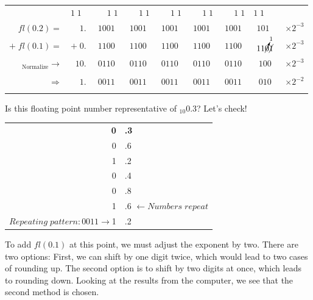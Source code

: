 \documentclass[a4paper,12pt]{report}
\begin{document}
\begin{center}
	\begin{tabular}{rrccccccr}
		&\tiny{$1\;1\;\;$} & \tiny{$\quad\, \;1\;1$} & \tiny{$\quad\, \;1\;1$}
			& \tiny{$\quad\, \;1\;1$} & \tiny{$\quad\, \;1\;1$} & \tiny{$\quad\, \;1\;1$}
			& \tiny{$1\;1\quad \;\,$} & \\
		$fl(0.2)=$ & $1.$ & $\!1001$ & $1001$ & $1001$ & $1001$ & $1001$ & $101\;\,$ 
			& $\times2^{-3}$\\
		$+\;fl(0.1)=$ & $+\;0.$ & $\!1100$ & $1100$ & $1100$ & $1100$ & $1100$ 
			& $11\cancelto{1}{0}\cancel{1}$ & $\times2^{-3}$\\
		\hline
		$_{\text{Normalize}}\rightarrow$& $10.$ & $\!0110$ & $0110$ & $0110$ & $0110$ 
			& $0110$ & $100$ & $\times2^{-3}$\\ \\

		$\Rightarrow$ & $1.$ & $\!0011$ & $0011$ & $0011$ & $0011$ & $0011$ & $010$ 
			& $\times2^{-2}$\\ \\
	\end{tabular}
\end{center}

	Is this floating point number representative of $_{10}0.3$? Let's check!

\begin{center}
	\begin{tabular}{r|l}
	\textbf{0} & \textbf{.3}\\
	0 &.6\\
	1 &.2\\
	0 &.4\\
	0 &.8\\
	1 &.6 $\leftarrow Numbers\; repeat$\\
	$Repeating\; pattern: 0011\! \rightarrow$1 &.2 \\
	\end{tabular}
\end{center}

	To add $fl(0.1)$ at this point, we must adjust the exponent by two.  There are two options: First, we can shift 
	by one digit twice, which would lead to two 	cases of rounding up. The second option is to shift by two digits at 
	once, which leads to rounding down.  Looking at the results from the computer, we see that the second method 
	is chosen.
\end{document}
